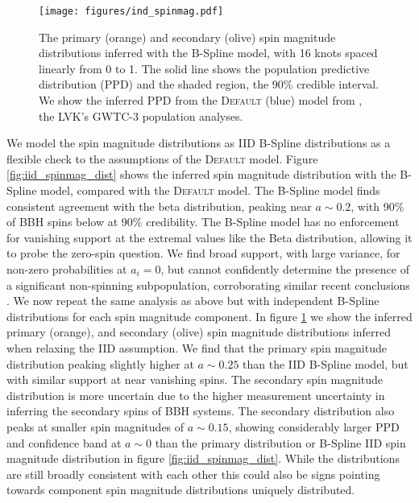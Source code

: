 \begin{figure} 
    \begin{centering}
        \texttt{[image: figures/ind\_spinmag.pdf]}
        \caption{The primary (orange) and secondary (olive) spin magnitude distributions inferred with the B-Spline model, 
        with 16 knots spaced linearly from 0 to 1. The solid line shows the population predictive distribution (PPD) and the shaded region, the 90\% credible interval. 
        We show the inferred PPD from the \textsc{Default} (blue) model from \citet{o3b_astro_dist}, the LVK's GWTC-3 population analyses.}
        \label{fig:ind_spinmag_dist}
    \end{centering}
\end{figure}

We model the spin magnitude distributions as IID B-Spline distributions as a flexible check to the assumptions of the \textsc{Default} model. 
Figure \ref{fig:iid_spinmag_dist} shows the inferred spin magnitude distribution with the B-Spline model, compared with the \textsc{Default} model. 
The B-Spline model finds consistent agreement with the beta distribution, peaking near $a\sim0.2$, with 90\% of BBH spins below 
\result{$\CIPlusMinus{\macros[BSplineIIDCompSpins][a_90percentile]}$} at 90\% credibility. The B-Spline model has no enforcement for vanishing support at the extremal values like the Beta distribution, 
allowing it to probe the zero-spin question. We find broad support, with large variance, for non-zero probabilities at $a_i=0$, but cannot confidently determine the presence of 
a significant non-spinning subpopulation, corroborating similar recent conclusions \citep{BuildBetterSpinModels,Callister_NoEvidence,GWTC3MonashSpin}. 
We now repeat the same analysis as above but with independent B-Spline distributions for each spin magnitude component. In figure \ref{fig:ind_spinmag_dist} 
we show the inferred primary (orange), and secondary (olive) spin magnitude distributions inferred when relaxing the IID assumption. We find that the primary spin magnitude distribution 
peaking slightly higher at $a\sim0.25$ than the IID B-Spline model, but with similar support at near vanishing spins. The secondary spin magnitude distribution is more uncertain due to the 
higher measurement uncertainty in inferring the secondary spins of BBH systems. The secondary distribution also peaks at smaller spin magnitudes of $a\sim0.15$, showing considerably larger 
PPD and confidence band at $a\sim0$ than the primary distribution or B-Spline IID spin magnitude distribution in figure \ref{fig:iid_spinmag_dist}. While the distributions are still broadly 
consistent with each other this could also be signs pointing towards component spin magnitude distributions uniquely distributed. 

